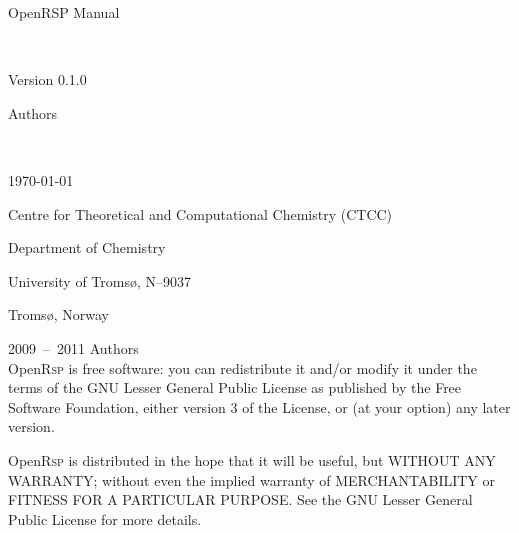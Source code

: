 \documentclass[a4paper,11pt,twoside,openright]{book}
\begin{document}
\frontmatter
\pagestyle{empty}

\vspace*{\fill}
\begin{center}
  \begin{Huge}\textsf{OpenR{\huge SP} Manual}\end{Huge}\\[0.5\baselineskip]
  \begin{LARGE}\textsf{Version 0.1.0}\end{LARGE}
\end{center}

\vspace*{\fill}
\begin{center}
  \begin{huge}\textsf{Authors}\end{huge}\\[0.5\baselineskip]
  \begin{LARGE}\textsf{\today}\end{LARGE}
\end{center}

\vspace*{\fill}
\begin{center}
  \begin{large}
    \textsf{Centre for Theoretical and Computational Chemistry (CTCC)}\par
    \textsf{Department of Chemistry}\par
    \textsf{University of Troms{\o}, N--9037}\par
    \textsf{Troms{\o}, Norway}\\[0.5\baselineskip]
  \end{large}
\end{center}

\clearpage

\begingroup
\footnotesize
\setlength{\parindent}{0pt}
\setlength{\parskip}{\baselineskip}
\textcopyright{} 2009~--~2011 Authors\\

Open\textsc{Rsp} is free software: you can redistribute it and/or modify
it under the terms of the GNU Lesser General Public License as published by
the Free Software Foundation, either version 3 of the License, or
(at your option) any later version.

Open\textsc{Rsp} is distributed in the hope that it will be useful,
but WITHOUT ANY WARRANTY; without even the implied warranty of
MERCHANTABILITY or FITNESS FOR A PARTICULAR PURPOSE. See the
GNU Lesser General Public License for more details.
\end{document}
